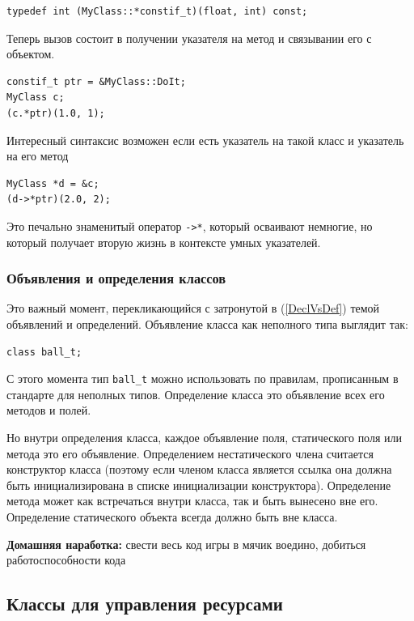 \documentclass[a4paper,12pt,oneside]{article}
\begin{document}
\begin{lstlisting}
typedef int (MyClass::*constif_t)(float, int) const; 
\end{lstlisting}

Теперь вызов состоит в получении указателя на метод и связывании его с объектом.

\begin{lstlisting}
constif_t ptr = &MyClass::DoIt;
MyClass c;
(c.*ptr)(1.0, 1);
\end{lstlisting}

Интересный синтаксис возможен если есть указатель на такой класс и указатель на его метод

\begin{lstlisting}
MyClass *d = &c;
(d->*ptr)(2.0, 2);
\end{lstlisting}

Это печально знаменитый оператор \lstinline!->*!, который осваивают немногие, но который получает вторую жизнь в контексте умных указателей.

\subsubsection{Объявления и определения классов}\label{DeclDefs}

Это важный момент, перекликающийся с затронутой в (\ref{DeclVsDef}) темой объявлений и определений. Объявление класса как неполного типа выглядит так:

\begin{lstlisting}
class ball_t;
\end{lstlisting}

С этого момента тип \lstinline!ball_t! можно использовать по правилам, прописанным в стандарте для неполных типов. Определение класса это объявление всех его методов и полей.

Но внутри определения класса, каждое объявление поля, статического поля или метода это его объявление. Определением нестатического члена считается конструктор класса (поэтому если членом класса является ссылка она должна быть инициализирована в списке инициализации конструктора). Определение метода может как встречаться внутри класса, так и быть вынесено вне его. Определение статического объекта всегда должно быть вне класса.

\textbf{Домашняя наработка:} свести весь код игры в мячик воедино, добиться работоспособности кода

\pagebreak
\subsection{Классы для управления ресурсами}\label{WrapClasses}
\end{document}
